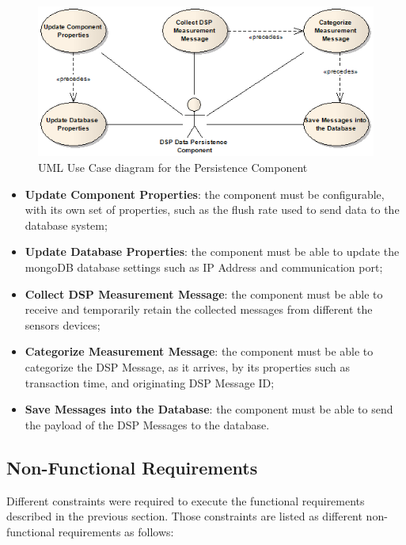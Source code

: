 \begin{figure}[!h]
  \centering
  \includegraphics[scale=0.65]{../diagrams/DSP-Data-Persistence-UseCases-Diagram-System}
  \caption{UML Use Case diagram for the Persistence Component}
  \label{fig:DSP-Data-Persistence-UseCases-Diagram-System}
\end{figure}

\begin{itemize}
  \item \textbf{Update Component Properties}: the component must be
  configurable, with its own set of properties, such as the flush rate used 
  to send data to the database system;
  \item \textbf{Update Database Properties}: the component must be able to
  update the mongoDB database settings such as IP Address and  communication 
  port;
  \item \textbf{Collect DSP Measurement Message}: the component must be
  able to receive and temporarily retain the collected messages from
  different the sensors devices;
  \item \textbf{Categorize Measurement Message}: the component must be able
  to categorize the DSP Message, as it arrives, by its properties such as 
  transaction time, and originating DSP Message ID;
  \item \textbf{Save Messages into the Database}: the component must be able
  to send the payload of the DSP Messages to the database.
\end{itemize}

\subsection{Non-Functional Requirements}

Different constraints were required to execute the functional requirements
described in the previous section. Those constraints are listed as different
non-functional requirements as follows:

